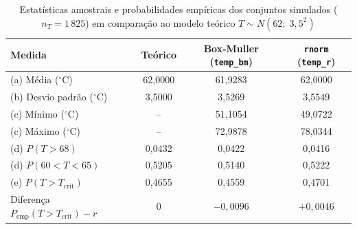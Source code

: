 \documentclass[10pt,a4paper]{article}
\begin{document}
\begin{table}[H]
\centering
\caption{Estatísticas amostrais e probabilidades empíricas dos conjuntos simulados ($n_T = 1\,825$) em comparação ao modelo teórico $T \sim N(62;\; 3{,}5^{2})$}
\label{tab:q3-resumo}
\begin{tabular}{lccc}
\hline
\textbf{Medida} & \textbf{Teórico} & \textbf{Box-Muller (\texttt{temp\_bm})} & \textbf{\texttt{rnorm} (\texttt{temp\_r})} \\
\hline
(a) Média ($^\circ\text{C}$)                & 62,0000 & 61,9283 & 62,0000 \\
(b) Desvio padrão ($^\circ\text{C}$)        & 3,5000  & 3,5269  & 3,5549  \\
(c) Mínimo ($^\circ\text{C}$)               & --      & 51,1054 & 49,0722 \\
(c) Máximo ($^\circ\text{C}$)               & --      & 72,9878 & 78,0344 \\
(d) $P(T > 68)$                             & 0,0432  & 0,0422  & 0,0416  \\
(d) $P(60 < T < 65)$                        & 0,5205  & 0,5140  & 0,5222  \\
(e) $P(T > T_{\text{crit}})$                & 0,4655  & 0,4559  & 0,4701  \\
Diferença $P_{\text{emp}}(T > T_{\text{crit}}) - r$ & 0 & $-0{,}0096$ & $+0{,}0046$ \\
\hline
\end{tabular}
\end{table}
\end{document}
